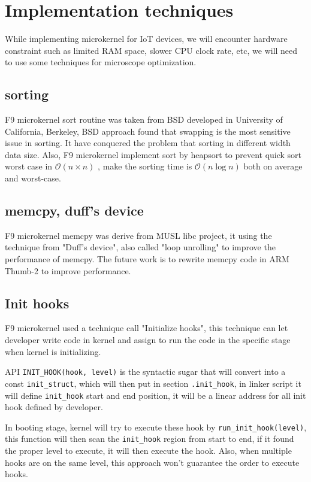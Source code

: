 \documentclass[10pt,preprint,nocopyrightspace]{sigplanconf}
\begin{document}
\section{Implementation techniques}

While implementing microkernel for IoT devices, we will encounter hardware constraint such as limited RAM space, slower CPU clock rate, etc, we will need to use some techniques for microscope optimization.

\subsection{sorting}
F9 microkernel sort routine was taken from BSD\cite{bentley1993engineering} developed in University of California, Berkeley, BSD approach found that swapping is the most sensitive issue in sorting. It have conquered the problem that sorting in different width data size. Also, F9 microkernel implement sort by heapsort to prevent quick sort worst case in $\mathcal{O}(n \times n)$ , make the sorting time is $\mathcal{O}(n\log{}n)$  both on average and worst-case.

\subsection{memcpy, duff's device}
F9 microkernel memcpy was derive from MUSL libc project\cite{felker}, it using the technique from "Duff's device", also called "loop unrolling" to improve the performance of memcpy. The future work is to rewrite memcpy code in ARM Thumb-2 to improve performance.

\subsection{Init hooks}

F9 microkernel used a technique call "Initialize hooks", this technique can let developer write code in kernel and assign to run the code in the specific stage when kernel is initializing.

API \verb|INIT_HOOK(hook, level)| is the syntactic sugar that will convert into a const \verb|init_struct|, which will then put in section \verb|.init_hook|, in linker script it will define \verb|init_hook| start and end position, it will be a linear address for all init hook defined by developer.

In booting stage, kernel will try to execute these hook by \verb|run_init_hook(level)|, this function will then scan the \verb|init_hook| region from start to end, if it found the proper level to execute, it will then execute the hook. Also, when multiple hooks are on the same level, this approach won't guarantee the order to execute hooks.
\end{document}
